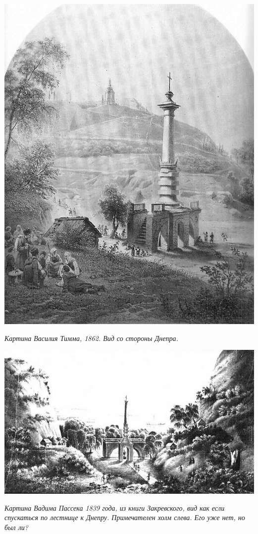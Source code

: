 \newpage
\vspace*{\fill}
\begin{center}
\includegraphics[width=\linewidth]{chast-colebanie-osnov/pochayna/nijn-vlad-01.jpg}

\textit{Картина Василия Тимма, 1862. Вид со стороны Днепра.}
\end{center}
\vspace*{\fill}
\newpage

\begin{center}
\includegraphics[width=\linewidth]{chast-colebanie-osnov/pochayna/1839-vadim-pasek-zakr.jpg}

\textit{Картина Вадима Пассека 1839 года, из книги Закревского, вид как если спускаться по лестнице к Днепру. Примечателен холм слева. Его уже нет, но был ли?}
\end{center}

